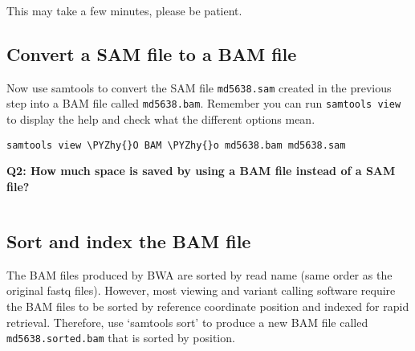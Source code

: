 \documentclass[11pt]{article}
\makeatletter
\def\PYZhy{\char`\-}
\newcommand{\boxspacing}{\kern\kvtcb@left@rule\kern\kvtcb@boxsep}
\newcommand{\prompt}[4]{
        \ttfamily\llap{{\color{#2}[#3]:\hspace{3pt}#4}}\vspace{-\baselineskip}
    }
\makeatother
\begin{document}
    This may take a few minutes, please be patient.

    \hypertarget{convert-a-sam-file-to-a-bam-file}{%
\subsection{Convert a SAM file to a BAM
file}\label{convert-a-sam-file-to-a-bam-file}}

Now use samtools to convert the SAM file \texttt{md5638.sam} created in
the previous step into a BAM file called \texttt{md5638.bam}. Remember
you can run \texttt{samtools view} to display the help and check what the
different options mean.

    \begin{tcolorbox}[breakable, size=fbox, boxrule=1pt, pad at break*=1mm,colback=cellbackground, colframe=cellborder]
\prompt{In}{incolor}{ }{\boxspacing}
\begin{Verbatim}[commandchars=\\\{\}]
samtools view \PYZhy{}O BAM \PYZhy{}o md5638.bam md5638.sam
\end{Verbatim}
\end{tcolorbox}

    \textbf{Q2: How much space is saved by using a BAM file instead of a SAM
file?}

    \begin{tcolorbox}[breakable, size=fbox, boxrule=1pt, pad at break*=1mm,colback=cellbackground, colframe=cellborder]
\prompt{In}{incolor}{ }{\boxspacing}
\begin{Verbatim}[commandchars=\\\{\}]

\end{Verbatim}
\end{tcolorbox}

    \hypertarget{sort-and-index-the-bam-file}{%
\subsection{Sort and index the BAM
file}\label{sort-and-index-the-bam-file}}

The BAM files produced by BWA are sorted by read name (same order as the
original fastq files). However, most viewing and variant calling
software require the BAM files to be sorted by reference coordinate
position and indexed for rapid retrieval. Therefore, use `samtools sort'
to produce a new BAM file called \texttt{md5638.sorted.bam} that is
sorted by position.
\end{document}
